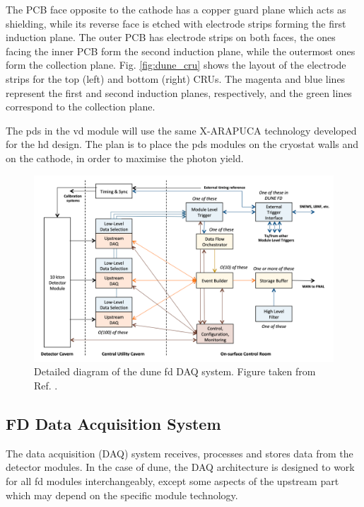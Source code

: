 The PCB face opposite to the cathode has a copper guard plane which acts as shielding, while its reverse face is etched with electrode strips forming the first induction plane. The outer PCB has electrode strips on both faces, the ones facing the inner PCB form the second induction plane, while the outermost ones form the collection plane. Fig. \ref{fig:dune_cru} shows the layout of the electrode strips for the top (left) and bottom (right) CRUs. The magenta and blue lines represent the first and second induction planes, respectively, and the green lines correspond to the collection plane.

The \gls{pds} in the \gls{vd} module will use the same X-ARAPUCA technology developed for the \gls{hd} design. The plan is to place the \gls{pds} modules on the cryostat walls and on the cathode, in order to maximise the photon yield.


\begin{figure}[t]
	\centering
	\includegraphics[width=0.8\linewidth]{Images/DUNE/FD/DAQ_detailed2}
	\caption[Detailed diagram of the \gls{dune} \gls{fd} DAQ system.]{Detailed diagram of the \gls{dune} \gls{fd} DAQ system. Figure taken from Ref. \cite{DUNE2020TDR4}.}
	\label{fig:daq1}
\end{figure}

\subsection{FD Data Acquisition System}

The data acquisition (DAQ) system receives, processes and stores data from the detector modules. In the case of \gls{dune}, the DAQ architecture is designed to work for all \gls{fd} modules interchangeably, except some aspects of the upstream part which may depend on the specific module technology.

